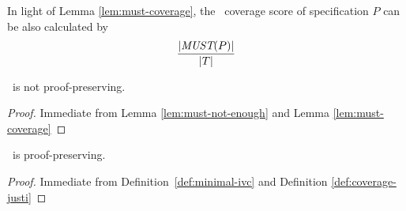 In light of Lemma \ref{lem:must-coverage}, the \nondetcovalt\ coverage score of specification $P$ can be also calculated by
$$\frac{|\textit{MUST}(P)|}{|T|}$$


%
\begin{corollary}
\label{cor:must-not-provable}
\nondetcovalt\ is not proof-preserving.
\end{corollary}
\begin{proof}
Immediate from Lemma \ref{lem:must-not-enough} and Lemma \ref{lem:must-coverage}
\end{proof}
\vspace{2mm}
\begin{corollary}
\label{cor:ivc-provable}
\ivccov\ is proof-preserving.
\end{corollary}
\begin{proof}
Immediate from Definition~\ref{def:minimal-ivc} and Definition \ref{def:coverage-justi}
\end{proof}
\vspace{2mm}

\fi

